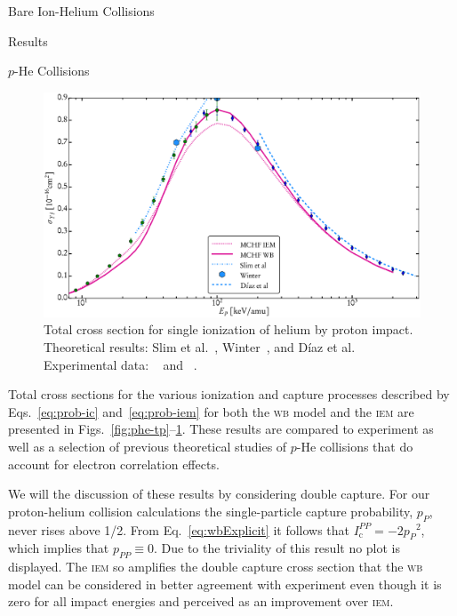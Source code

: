 \documentclass[letterpaper, 11 pt]{report}
\begin{document}
\begin{chapter}{Bare Ion-Helium Collisions \label{chap:p-he2p-he}}
\begin{section}{Results \label{sec:phe2p-res}}
\begin{subsection}{\texorpdfstring{$p$}{p}-He Collisions \label{sec:phe-res}}
         \begin{figure}[t]
            \centering
            \includegraphics[width = 0.95 \linewidth]{./images/phe/phe-TI.eps}
            \caption[Total cross section for single ionization of helium by proton impact.]
                    {Total cross section for single ionization of helium by proton impact.
                     Theoretical results: Slim et al.~\cite{SHBF-91},
                     Winter~\cite{Winter-91}, and D\'{i}az et al.~\cite{DMS-00}
                     Experimental data: {\color{OliveGreen}{$\bullet$}}~\cite{SG89} and
                     {\color{blue}{$\blacklozenge$}}~\cite{SG85}. \label{fig:phe-ti}}
         \end{figure}

         Total cross sections for the various ionization and capture processes described by
         Eqs.~\eqref{eq:prob-ic} and~\eqref{eq:prob-iem} for both the \textsc{wb} model and the
         \textsc{iem} are presented in Figs.~\ref{fig:phe-tp}--\ref{fig:phe-ti}. These results are
         compared to experiment as well as a selection of previous theoretical studies of $p$-He
         collisions that do account for electron correlation effects.

         We will the discussion of these results by considering double capture. For our
         proton-helium collision calculations the single-particle capture probability, $p_P$, never
         rises above 1/2. From Eq.~\eqref{eq:wbExplicit} it follows that $I^{PP}_\mathrm{c} =
         -2 {p_P}^2$, which implies that $p_{PP} \equiv 0$. Due to the triviality of this result no plot
         is displayed. The \textsc{iem} so amplifies the double capture cross section that the
         \textsc{wb} model can be considered in better agreement with experiment even though it is zero
         for all impact energies and perceived as an improvement over \textsc{iem}.


\end{subsection}
\end{section}
\end{chapter}
\end{document}
